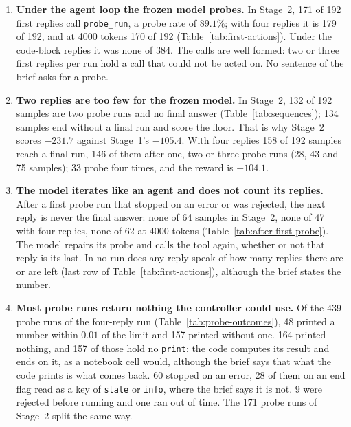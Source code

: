 \documentclass[11pt,a4paper]{article}
\begin{document}
\begin{enumerate}[leftmargin=1.5em]
  \item \textbf{Under the agent loop the frozen model probes.} In Stage~2,
  171 of 192 first replies call \texttt{probe\_run}, a probe rate of
  $89.1\%$; with four replies it is 179 of 192, and at 4000 tokens 170 of
  192 (Table~\ref{tab:first-actions}). Under the code-block replies it was
  none of 384. The calls are well formed: two or three first replies per
  run hold a call that could not be acted on. No sentence of the brief asks
  for a probe.

  \item \textbf{Two replies are too few for the frozen model.} In Stage~2,
  132 of 192 samples are two probe runs and no final answer
  (Table~\ref{tab:sequences}); 134 samples end without a final run and
  score the floor. That is why Stage~2 scores $-231.7$ against Stage~1's
  $-105.4$. With four replies 158 of 192 samples reach a final run, 146
  of them after one, two or three probe runs (28, 43 and 75 samples); 33
  probe four times, and the reward is $-104.1$.

  \item \textbf{The model iterates like an agent and does not count its
  replies.} After a first probe run that stopped on an error or was
  rejected, the next reply is never the final answer: none of 64 samples in
  Stage~2, none of 47 with four replies, none of 62 at 4000 tokens
  (Table~\ref{tab:after-first-probe}). The model repairs its probe and
  calls the tool again, whether or not that reply is its last. In no run
  does any reply speak of how many replies there are or are left (last row
  of Table~\ref{tab:first-actions}), although the brief states the number.

  \item \textbf{Most probe runs return nothing the controller could use.}
  Of the 439 probe runs of the four-reply run
  (Table~\ref{tab:probe-outcomes}), 48 printed a number within $0.01$ of
  the limit and 157 printed without one. 164 printed nothing, and 157 of
  those hold no \texttt{print}: the code computes its result and ends on
  it, as a notebook cell would, although the brief says that what the code
  prints is what comes back. 60 stopped on an error, 28 of them on an end
  flag read as a key of \texttt{state} or \texttt{info}, where the brief
  says it is not. 9 were rejected before running and one ran out of time.
  The 171 probe runs of Stage~2 split the same way.


\end{enumerate}
\end{document}

